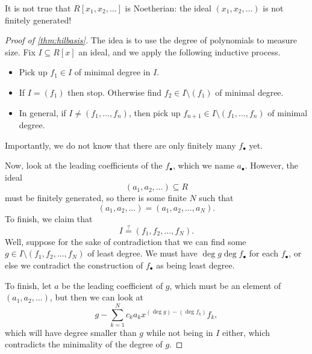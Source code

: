 \begin{warn}
	It is not true that $R[x_1,x_2,\ldots]$ is Noetherian: the ideal $(x_1,x_2,\ldots)$ is not finitely generated!
\end{warn}
\begin{proof}[Proof of \autoref{thm:hilbasis}]
	The idea is to use the degree of polynomials to measure size. Fix $I\subseteq R[x]$ an ideal, and we apply the following inductive process.
	\begin{itemize}
		\item Pick up $f_1\in I$ of minimal degree in $I$.
		\item If $I=(f_1)$ then stop. Otherwise find $f_2\in I\setminus(f_1)$ of minimal degree.
		\item In general, if $I\ne(f_1,\ldots,f_n)$, then pick up $f_{n+1}\in I\setminus(f_1,\ldots,f_n)$ of minimal degree.
	\end{itemize}
	Importantly, we do not know that there are only finitely many $f_\bullet$ yet.

	Now, look at the leading coefficients of the $f_\bullet$, which we name $a_\bullet$. However, the ideal
	\[(a_1,a_2,\ldots)\subseteq R\]
	must be finitely generated, so there is some finite $N$ such that
	\[(a_1,a_2,\ldots)=(a_1,a_2,\ldots,a_N).\]
	To finish, we claim that
	\[I\stackrel?=(f_1,f_2,\ldots,f_N).\]
	Well, suppose for the sake of contradiction that we can find some $g\in I\setminus(f_1,f_2,\ldots,f_N)$ of least degree. We must have $\deg g\deg f_\bullet$ for each $f_\bullet$, or else we contradict the construction of $f_\bullet$ as being least degree.

	To finish, let $a$ be the leading coefficient of $g$, which must be an element of $(a_1,a_2,\ldots)$, but then we can look at
	\[g-\sum_{k=1}^Nc_ka_kx^{(\deg g)-(\deg f_k)}f_k,\]
	which will have degree smaller than $g$ while not being in $I$ either, which contradicts the minimality of the degree of $g$.
\end{proof}


